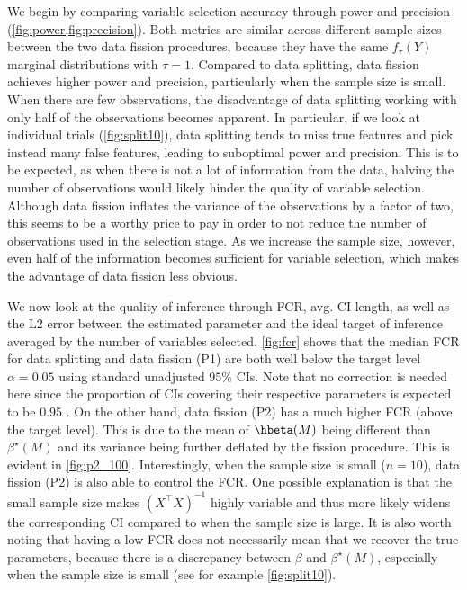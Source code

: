 We begin by comparing variable selection accuracy through power and precision (\cref{fig:power,fig:precision}). Both metrics are similar across different sample sizes between the two data fission procedures, because they have the same $f_\tau(Y)$ marginal distributions with $\tau=1$. Compared to data splitting, data fission achieves higher power and precision, particularly when the sample size is small. When there are few observations, the disadvantage of data splitting working with only half of the observations becomes apparent. In particular, if we look at individual trials (\cref{fig:split10}), data splitting tends to miss true features and pick instead many false features, leading to suboptimal power and precision. This is to be expected, as when there is not a lot of information from the data, halving the number of observations would likely hinder the quality of variable selection. Although data fission inflates the variance of the observations by a factor of two, this seems to be a worthy price to pay in order to not reduce the number of observations used in the selection stage. As we increase the sample size, however, even half of the information becomes sufficient for variable selection, which makes the advantage of data fission less obvious.

We now look at the quality of inference through FCR, avg. CI length, as well as the L2 error between the estimated parameter and the ideal target of inference averaged by the number of variables selected. \cref{fig:fcr} shows that the median FCR for data splitting and data fission (P1) are both well below the target level $\alpha = 0.05$ using standard unadjusted $95\%$ CIs. Note that no correction is needed here since the proportion of CIs covering their respective parameters is expected to be $0.95$ \citep{benjamini2005false}. On the other hand, data fission (P2) has a much higher FCR (above the target level). This is due to the mean of $\hbeta(M)$ being different than $\beta^\star(M)$ and its variance being further deflated by the fission procedure. This is evident in \cref{fig:p2_100}. Interestingly, when the sample size is small ($n=10$), data fission (P2) is also able to control the FCR. One possible explanation is that the small sample size makes $(X^\top X)^{-1}$ highly variable and thus more likely widens the corresponding CI compared to when the sample size is large. It is also worth noting that having a low FCR does not necessarily mean that we recover the true parameters, because there is a discrepancy between $\beta$ and $\beta^\star(M)$, especially when the sample size is small (see for example \cref{fig:split10}).

